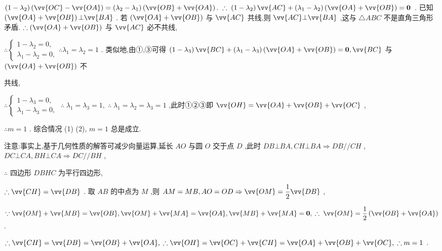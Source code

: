 $\left( {1 - {\lambda }_{2}}\right) \left( {\vv{OC} - \vv{OA}}\right)  = \left( {{\lambda }_{2} - {\lambda }_{1}}\right) \left( {\vv{OB} + \vv{OA}}\right) .\;\therefore \;\left( {1 - {\lambda }_{2}}\right) \vv{AC} + \left( {{\lambda }_{1} - {\lambda }_{2}}\right) \left( {\vv{OA} + \vv{OB}}\right)  = \mathbf{0}$ . 已知 $\left( {\vv{OA} + \vv{OB}}\right) \bot \vv{BA}$ . 若 $\left( {\vv{OA} + \vv{OB}}\right)$ 与 $\vv{AC}$ 共线,则 $\vv{AC}\bot \vv{BA}$ ,这与 $\bigtriangleup {ABC}$ 不是直角三角形矛盾. $\therefore \left( {\vv{OA} + \vv{OB}}\right)$ 与 $\vv{AC}$ 必不共线,

$\therefore \left\{  {\begin{array}{l} 1 - {\lambda }_{2} = 0, \\  {\lambda }_{1} - {\lambda }_{2} = 0, \end{array}\therefore {\lambda }_{1} = {\lambda }_{2} = 1}\right.$ . 类似地,由①,③可得 $\left( {1 - {\lambda }_{3}}\right) \vv{BC} + \left( {{\lambda }_{1} - {\lambda }_{3}}\right) \left( {\vv{OA} + \vv{OB}}\right)  = \mathbf{0},\vv{BC}$ 与 $\left( {\vv{OA} + \vv{OB}}\right)$ 不

共线,

$\therefore \left\{  {\begin{array}{l} 1 - {\lambda }_{3} = 0, \\  {\lambda }_{1} - {\lambda }_{3} = 0, \end{array}\;\therefore \;{\lambda }_{1} = {\lambda }_{3} = 1,\;\therefore \;{\lambda }_{1} = {\lambda }_{2} = {\lambda }_{3} = 1}\right.$ ,此时①②③即 $\vv{OH} = \vv{OA} + \vv{OB} + \vv{OC}$ ,

$\therefore m = 1$ . 综合情况 (1) (2), $m = 1$ 总是成立.

注意:事实上,基于几何性质的解答可减少向量运算,延长 ${AO}$ 与圆 $O$ 交于点 $D$ ,此时 ${DB}\bot {BA},{CH}\bot {BA} \Rightarrow  {DB}//{CH}$ , ${DC} \bot  {CA},{BH} \bot  {CA} \Rightarrow  {DC}//{BH}$ ,

$\therefore$ 四边形 ${DBHC}$ 为平行四边形,

$\therefore \vv{CH} = \vv{DB}$ . 取 ${AB}$ 的中点为 $M$ ,则 ${AM} = {MB},{AO} = {OD} \Rightarrow  \vv{OM} = \dfrac{1}{2}\vv{DB}$ ,

$\because \vv{OM} + \vv{MB} = \vv{OB},\vv{OM} + \vv{MA} = \vv{OA},\vv{MB} + \vv{MA} = \mathbf{0},\;\therefore \;\vv{OM} = \dfrac{1}{2}\left( {\vv{OB} + \vv{OA}}\right)$ .

$\therefore \vv{CH} = \vv{DB} = \vv{OB} + \vv{OA},\;\therefore \vv{OH} = \vv{OC} + \vv{CH} = \vv{OA} + \vv{OB} + \vv{OC},\;\therefore m = 1$ .

